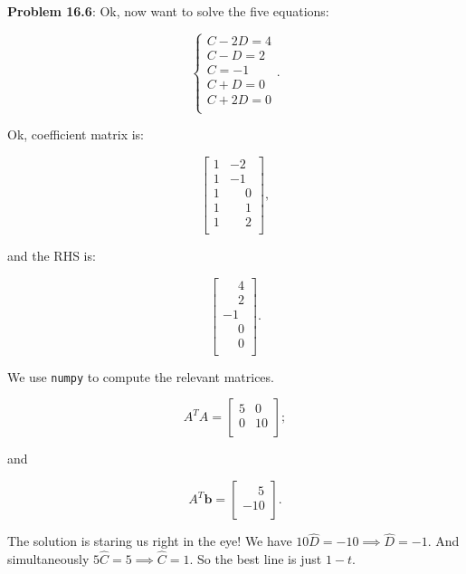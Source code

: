 \documentclass{article}
\begin{document}
\noindent \textbf{Problem 16.6}: Ok, now want to solve the five equations:

\[
\begin{cases}
C -2D = 4\\
C -D = 2\\
C = -1\\
C + D = 0\\
C + 2D = 0\\
\end{cases}.
\]

Ok, coefficient matrix is:

\[
\begin{bmatrix}
1 & -2\\
1 & -1\\
1 & \phantom{-}0\\
1 & \phantom{-}1\\
1 & \phantom{-}2\\
\end{bmatrix},
\]

and the RHS is:

\[
\begin{bmatrix}
\phantom{-}4\\
\phantom{-}2\\
-1\\
\phantom{-}0\\
\phantom{-}0\\
\end{bmatrix}.
\]

We use \texttt{numpy} to compute the relevant matrices.

\[
A^{T}A = \begin{bmatrix}
5 & 0\\
0 & 10\\
\end{bmatrix};
\]

and

\[
A^{T}\mathbf{b} = \begin{bmatrix}
\phantom{-}5\\
-10\\
\end{bmatrix}.
\]

The solution is staring us right in the eye! We have $10\widehat{D} = -10 \implies \widehat{D} = -1$. And simultaneously $5\widehat{C} = 5 \implies \widehat{C} = 1$. So the best line is just $1 - t$.
\end{document}
